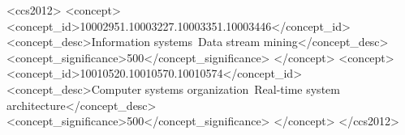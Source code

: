 %
%
\begin{CCSXML}
	<ccs2012>
	<concept>
	<concept_id>10002951.10003227.10003351.10003446</concept_id>
	<concept_desc>Information systems~Data stream mining</concept_desc>
	<concept_significance>500</concept_significance>
	</concept>
	<concept>
	<concept_id>10010520.10010570.10010574</concept_id>
	<concept_desc>Computer systems organization~Real-time system architecture</concept_desc>
	<concept_significance>500</concept_significance>
	</concept>
	</ccs2012>
\end{CCSXML}


{\raggedright\printccsdesc\par}

